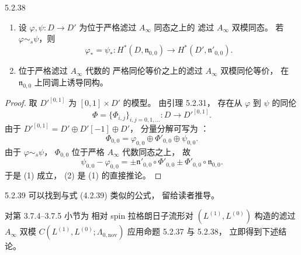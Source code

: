 \begin{proposition}{5.2.38}\label{prop:5-2-38}
\begin{enumerate}[label=\textup{(\arabic*)},leftmargin=2.8em]
\item 设 $\varphi,\psi:D\to D'$
为位于严格滤过 $A_\infty$ 同态之上的
滤过 $A_\infty$ 双模同态。
若 $\varphi\sim_s\psi$，则
\[
\varphi_*=\psi_*:
H^*(D,\mathfrak n_{0,0})
\longrightarrow
H^*(D',\mathfrak n'_{0,0}).
\]
\item 位于严格滤过 $A_\infty$ 代数的
严格同伦等价之上的滤过
$A_\infty$ 双模同伦等价，
在 $\mathfrak n_{0,0}$ 上同调上诱导同构。
\end{enumerate}
\end{proposition}

\begin{proof}
取 $D'^{[0,1]}$ 为
$[0,1]\times D'$ 的模型。
由引理 5.2.31，
存在从 $\varphi$ 到 $\psi$ 的同伦
\[
\Phi=\{\Phi_{i,j}\}_{i,j=0,1,\ldots}:
D\longrightarrow D'^{[0,1]}.
\]
由于
$D'^{[0,1]}=D'\oplus D'[-1]\oplus D'$，
分量分解可写为
：
\[
\Phi_{0,0}=
\varphi_{0,0}\oplus
\Phi'_{0,0}\oplus
\psi_{0,0}.
\]
由于 $\varphi\sim_s\psi$，
$\Phi_{0,0}$ 位于严格
$A_\infty$ 代数同态之上，
故
\[
\psi_{0,0}-\varphi_{0,0}
=\pm\mathfrak n'_{0,0}\circ\Phi'_{0,0}
\pm\Phi'_{0,0}\circ\mathfrak n_{0,0}.
\]
于是 (1) 成立，
(2) 是 (1) 的直接推论。
\end{proof}

\begin{remark}{5.2.39}\label{rem:5-2-39}
可以找到与式 (4.2.39) 类似的公式，
留给读者推导。
\end{remark}

对第 3.7.4--3.7.5 小节为
相对 spin 拉格朗日子流形对
$(L^{(1)},L^{(0)})$
构造的滤过 $A_\infty$ 双模
$C(L^{(1)},L^{(0)};\Lambda_{0,\mathrm{nov}})$
应用命题 5.2.37 与 5.2.38，
立即得到下述结论。


